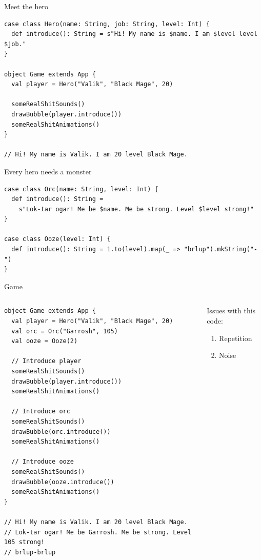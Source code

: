 \documentclass[presentation,aspectratio=169,smaller]{beamer}
\begin{document}
\begin{frame}[label={sec:org3393984},fragile]{Meet the hero}
 \begin{verbatim}
case class Hero(name: String, job: String, level: Int) {
  def introduce(): String = s"Hi! My name is $name. I am $level level $job."
}

object Game extends App {
  val player = Hero("Valik", "Black Mage", 20)

  someRealShitSounds()
  drawBubble(player.introduce())
  someRealShitAnimations()
}

// Hi! My name is Valik. I am 20 level Black Mage.
\end{verbatim}
\end{frame}

\begin{frame}[label={sec:org79ca1c6},fragile]{Every hero needs a monster}
 \begin{verbatim}
case class Orc(name: String, level: Int) {
  def introduce(): String =
    s"Lok-tar ogar! Me be $name. Me be strong. Level $level strong!"
}

case class Ooze(level: Int) {
  def introduce(): String = 1.to(level).map(_ => "brlup").mkString("-")
}
\end{verbatim}
\end{frame}

\begin{frame}[label={sec:org6ca6fdc},fragile]{Game}
 \begin{columns}
\begin{column}[t]{0.46\columnwidth}
\begin{verbatim}
object Game extends App {
  val player = Hero("Valik", "Black Mage", 20)
  val orc = Orc("Garrosh", 105)
  val ooze = Ooze(2)

  // Introduce player
  someRealShitSounds()
  drawBubble(player.introduce())
  someRealShitAnimations()

  // Introduce orc
  someRealShitSounds()
  drawBubble(orc.introduce())
  someRealShitAnimations()

  // Introduce ooze
  someRealShitSounds()
  drawBubble(ooze.introduce())
  someRealShitAnimations()
}

// Hi! My name is Valik. I am 20 level Black Mage.
// Lok-tar ogar! Me be Garrosh. Me be strong. Level 105 strong!
// brlup-brlup
\end{verbatim}

\pause
\end{column}

\begin{column}[t]{0.46\columnwidth}
\vspace*{0px}

Issues with this code:

\begin{enumerate}
\item Repetition
\item Noise
\end{enumerate}
\end{column}
\end{columns}
\end{frame}
\end{document}
